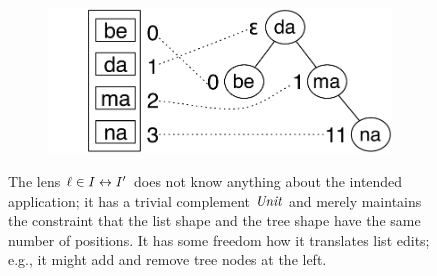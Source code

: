 \ifdissertation\begin{figure}
\else          \begin{figure}\hspace*{-3em}
\fi
\includegraphics[scale=.32]{images/restruct1.pdf}
\end{figure}
The lens $\ell\in I\leftrightarrow I'$ does not know anything about the intended
application; it has a trivial complement $\mathit{Unit}$ and
merely maintains the constraint that the list shape and the tree shape
have the same number of positions. It has some freedom how it
translates list edits; e.g., it might add and remove tree nodes at the
left.


\end{figure}
